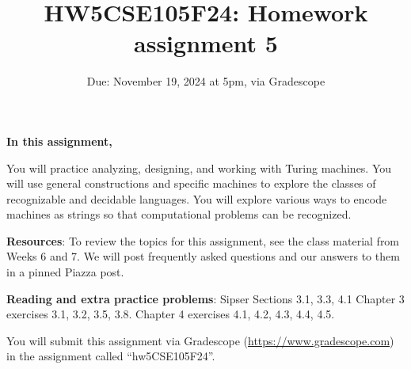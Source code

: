 

\title{HW5CSE105F24: Homework assignment 5}
\date{Due: November 19, 2024 at 5pm, via Gradescope}



\maketitle
\thispagestyle{fancy}

{\bf In this assignment,}

You will  practice analyzing, designing, and working with Turing machines.
You will use general constructions and specific machines to explore the classes 
of recognizable and decidable languages. 
You will explore various ways to encode machines as strings so that 
computational problems can be recognized.

{\bf Resources}: To review the topics 
for this assignment, see the class material from Weeks 6 and 7.
We will post frequently asked questions and our answers to them in a 
pinned Piazza post. 

{\bf Reading and extra practice problems}:  
Sipser Sections 3.1, 3.3, 4.1
Chapter 3 exercises 3.1, 3.2, 3.5, 3.8.
Chapter 4 exercises 4.1, 4.2, 4.3, 4.4, 4.5.

\instructions

You will submit this assignment via Gradescope
(\href{https://www.gradescope.com}{https://www.gradescope.com}) 
in the assignment called ``hw5CSE105F24''.

